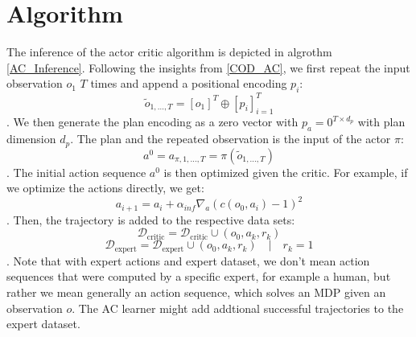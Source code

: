 \section{Algorithm}
The inference of the actor critic algorithm is depicted in algrothm \ref{AC_Inference}.
Following the insights from \ref{COD_AC}, we first repeat the input observation $o_1$ $T$ times and append a positional encoding $p_i$:
\begin{equation*}
    \tilde{o}_{1, ..., T} = [o_1]^T \oplus [p_i]_{i=1}^T
\end{equation*}
. We then generate the plan encoding as a zero vector with $p_a = 0^{T \times d_p}$ with plan dimension $d_p$. The plan and the repeated observation is the input 
of the actor $\pi$:
\begin{equation}
    a^0 = a_{\pi, 1,...,T} = \pi(\tilde{o}_{1, ..., T})
\end{equation}
. The initial action sequence $a^0$ is then optimized given the critic. For example, if we optimize the actions directly, we get:
\begin{equation*}
    a_{i+1} = a_i + \alpha_{inf}\nabla_{a} (c(o_0, a_i) - 1)^2
\end{equation*}
. Then, the trajectory is added to the respective data sets:
\begin{equation}
    \mathcal{D}_{\text{critic}} = \mathcal{D}_{\text{critic}} \cup (o_0, a_k, r_k)
\end{equation}
\begin{equation*}
    \mathcal{D}_{\text{expert}} = \mathcal{D}_{\text{expert}} \cup (o_0, a_k, r_k)\quad |\quad r_k = 1
\end{equation*}
. Note that with expert actions and expert dataset, we don't mean action sequences that were computed by 
a specific expert, for example a human, but rather we mean generally an action sequence, which solves an MDP given an observation $o$. The AC learner might add 
addtional successful trajectories to the expert dataset. \\
